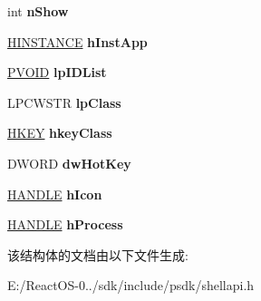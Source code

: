 \begin{DoxyCompactItemize}
\item 
\mbox{\label{struct___s_h_e_l_l_e_x_e_c_u_t_e_i_n_f_o_w_a5c7a3fef3f729bb4cc9466959ed62221}} 
int {\bfseries n\+Show}
\item 
\mbox{\label{struct___s_h_e_l_l_e_x_e_c_u_t_e_i_n_f_o_w_af6197d2f1827a0d3ff12385e03f4d55f}} 
\hyperlink{interfacevoid}{H\+I\+N\+S\+T\+A\+N\+CE} {\bfseries h\+Inst\+App}
\item 
\mbox{\label{struct___s_h_e_l_l_e_x_e_c_u_t_e_i_n_f_o_w_a894953d76df37cfd011dc7352a9c4a75}} 
\hyperlink{interfacevoid}{P\+V\+O\+ID} {\bfseries lp\+I\+D\+List}
\item 
\mbox{\label{struct___s_h_e_l_l_e_x_e_c_u_t_e_i_n_f_o_w_aaa4247eb6af06b64c86e0428dceddccf}} 
L\+P\+C\+W\+S\+TR {\bfseries lp\+Class}
\item 
\mbox{\label{struct___s_h_e_l_l_e_x_e_c_u_t_e_i_n_f_o_w_a905f24e5ea4a86adbdeeab3fbb8fc87e}} 
\hyperlink{interfacevoid}{H\+K\+EY} {\bfseries hkey\+Class}
\item 
\mbox{\label{struct___s_h_e_l_l_e_x_e_c_u_t_e_i_n_f_o_w_a6556c561a245118ab04ff315f8b0edfc}} 
D\+W\+O\+RD {\bfseries dw\+Hot\+Key}
\item 
\mbox{\label{struct___s_h_e_l_l_e_x_e_c_u_t_e_i_n_f_o_w_a41ec536ab696b13dfe28a18495a819f6}} 
\hyperlink{interfacevoid}{H\+A\+N\+D\+LE} {\bfseries h\+Icon}
\item 
\mbox{\label{struct___s_h_e_l_l_e_x_e_c_u_t_e_i_n_f_o_w_a299407cf0231a5be09503eba16acae54}} 
\hyperlink{interfacevoid}{H\+A\+N\+D\+LE} {\bfseries h\+Process}
\end{DoxyCompactItemize}


该结构体的文档由以下文件生成\+:\begin{DoxyCompactItemize}
\item 
E\+:/\+React\+O\+S-\/0../sdk/include/psdk/shellapi.\+h\end{DoxyCompactItemize}
